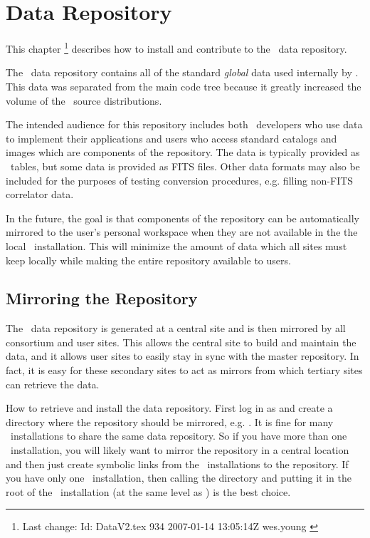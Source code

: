 \chapter{Data Repository}
\label{data repository}
\label{Data Repository}

This chapter \footnote{Last change:
$ $Id: DataV2.tex 934 2007-01-14 13:05:14Z wes.young $ $}
describes how to install and contribute to the \aipspp\ data repository.

The \aipspp\ data repository contains all of the standard \textit{global}
data used internally by \aipspp. This data was separated from the main code tree
because it greatly increased the volume of the \aipspp\ source distributions.

The intended audience for this repository includes both \aipspp\ developers
who use data to implement their applications and users who access standard
catalogs and images which are components of the repository. The data is
typically provided as \aipspp\ tables, but some data is provided as FITS
files. Other data formats may also be included for the purposes of testing
conversion procedures, e.g. filling non-FITS correlator data.

In the future, the goal is that components of the repository can be
automatically mirrored to the user's personal workspace when they are not
available in the the local \aipspp\ installation. This will minimize the
amount of data which all sites must keep locally while making the entire
repository available to users.


\section{Mirroring the Repository}
\label{data repository mirroring}

The \aipspp\ data repository is generated at a central site and is then
mirrored by all consortium and user sites. This allows the central site
to build and maintain the data, and it allows user sites to easily stay
in sync with the master repository. In fact, it is easy for these secondary
sites to act as mirrors from which tertiary sites can retrieve the data.

How to retrieve and install the data repository. First log in as 
and create a directory where the repository should be mirrored, e.g. .
It is fine for many \aipspp\ installations to share the same data repository. So if
you have more than one \aipspp\ installation, you will likely want to mirror the
repository in a central location and then just create symbolic links from the
\aipspp\ installations to the repository. If you have only one \aipspp\ installation,
then calling the directory  and putting it in the root of the
\aipspp\ installation (at the same level as ) is the best choice.


